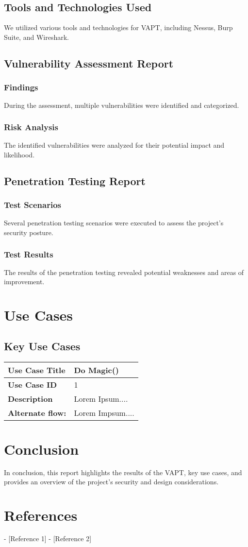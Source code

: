 \documentclass[11pt]{article}
\begin{document}
\subsection{Tools and Technologies Used}
We utilized various tools and technologies for VAPT, including Nessus, Burp Suite, and Wireshark.

\subsection{Vulnerability Assessment Report}
\subsubsection{Findings}
During the assessment, multiple vulnerabilities were identified and categorized.

\subsubsection{Risk Analysis}
The identified vulnerabilities were analyzed for their potential impact and likelihood.

\subsection{Penetration Testing Report}
\subsubsection{Test Scenarios}
Several penetration testing scenarios were executed to assess the project's security posture.

\subsubsection{Test Results}
The results of the penetration testing revealed potential weaknesses and areas of improvement.

\section{Use Cases}
\subsection{Key Use Cases}
\begin{tabularx}{\textwidth}{|l|X|}
    \hline
    \textbf{Use Case Title} & Do Magic() \\
    \hline
    \textbf{Use Case ID} & 1 \\
    \hline
    \textbf{Description} & Lorem Ipsum.... \\
    \hline 
    \textbf{Alternate flow:} & Lorem Impsum.... \\
    \hline 
\end{tabularx}

\section{Conclusion}
In conclusion, this report highlights the results of the VAPT, key use cases, and provides an overview of the project's security and design considerations.

\section{References}
- [Reference 1]
- [Reference 2]
\end{document}

